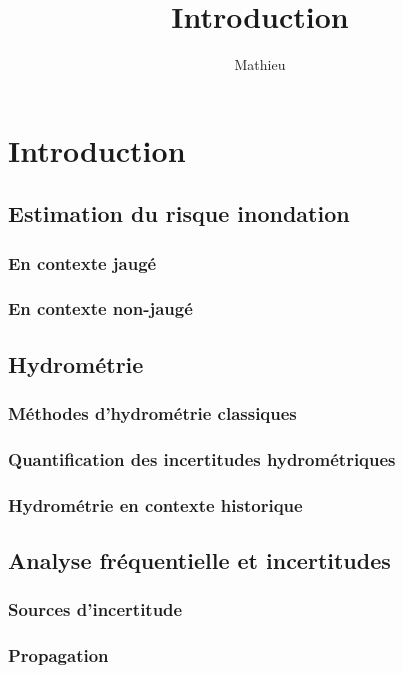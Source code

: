 \documentclass[11pt]{article}
\title{Introduction}
\author{Mathieu}
\begin{document}
\maketitle

\tableofcontents

\section{Introduction}


	\subsection{Estimation du risque inondation}
	    \subsubsection{En contexte jaugé}
	    \subsubsection{En contexte non-jaugé}
	    
	\subsection{Hydrométrie}
		\subsubsection{Méthodes d'hydrométrie classiques}
		\subsubsection{Quantification des incertitudes hydrométriques}
		\subsubsection{Hydrométrie en contexte historique}
		
	\subsection{Analyse fréquentielle et incertitudes}
		\subsubsection{Sources d'incertitude}
		\subsubsection{Propagation}
		
\end{document}

